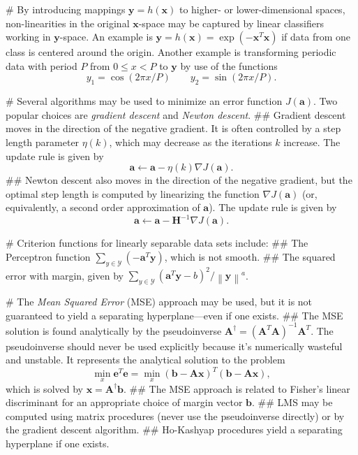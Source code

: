 \documentclass[12pt, a4paper]{article}
\newcommand{\Y}{\mathcal{Y}}
\newcommand{\vect}[1]{\bm{#1}}
\newcommand{\norm}[1]{\left\lVert#1\right\rVert}
\begin{document}
\begin{easylist}[itemize]
# By introducing mappings $\vect{y} = h(\vect{x})$ to higher- or lower-dimensional spaces, non-linearities in the original $\vect{x}$-space may be captured by linear classifiers working in $\vect{y}$-space. 
An example is $\vect{y} = h(\vect{x}) = \exp(-\vect{x}^T \vect{x})$ if data from one class is centered around the origin.
Another example is transforming periodic data with period $P$ from $0 \leq x < P$ to $\vect{y}$ by use of the functions
\begin{equation*}
	y_1 = \cos \left( 2 \pi x / P \right)
	\qquad 
	y_2 = \sin \left( 2 \pi x / P \right).
\end{equation*}

# Several algorithms may be used to minimize an error function $J(\vect{a})$.
Two popular choices are \emph{gradient descent} and \emph{Newton descent}.
## Gradient descent moves in the direction of the negative gradient.
It is often controlled by a step length parameter $\eta(k)$, which may decrease as the iterations $k$ increase.
The update rule is given by
\begin{equation*}
	\vect{a} \leftarrow \vect{a} - \eta(k) \nabla J(\vect{a}).
\end{equation*}
## Newton descent also moves in the direction of the negative gradient, but the optimal step length is computed by linearizing the function $\nabla J(\vect{a})$ (or, equivalently, a second order approximation of $\vect{a}$).
The update rule is given by
\begin{equation*}
\vect{a} \leftarrow \vect{a} - \vect{H}^{-1} \nabla J(\vect{a}).
\end{equation*}

# Criterion functions for linearly separable data sets include:
## The Perceptron function $\sum_{y \in \Y} (-\vect{a}^T \vect{y})$, which is not smooth.
## The squared error with margin, given by $\sum_{y \in \Y} (\vect{a}^T \vect{y} - b)^2 / \norm{\vect{y}}^a$.

# The \emph{Mean Squared Error} (MSE) approach may be used, but it is not guaranteed to yield a separating hyperplane---even if one exists.
## The MSE solution is found analytically by the pseudoinverse $\vect{A}^\dagger = \left( \vect{A}^T \vect{A} \right)^{-1} \vect{A}^T$. 
The pseudoinverse should never be used explicitly because it's numerically wasteful and unstable.
It represents the analytical solution to the problem
\begin{equation*}
	\min_x \vect{e}^T\vect{e} = 
	\min_x \left(\vect{b} - \vect{A}\vect{x}\right)^T
	\left(\vect{b} - \vect{A}\vect{x}\right),
\end{equation*}
which is solved by $\vect{x} = \vect{A}^\dagger \vect{b}$.
## The MSE approach is related to Fisher's linear discriminant for an appropriate choice of margin vector $\vect{b}$.
## LMS may be computed using matrix procedures (never use the pseudoinverse directly) or by the gradient descent algorithm.
## Ho-Kashyap procedures yield a separating hyperplane if one exists.


\end{easylist}
\end{document}
